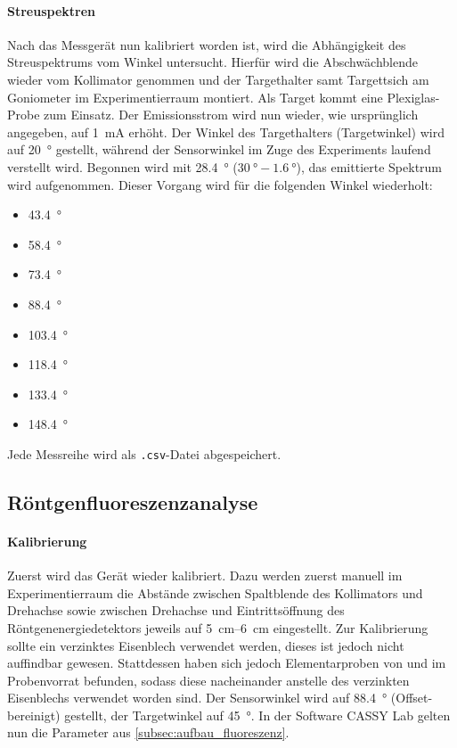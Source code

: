\documentclass[ngerman]{scrartcl}
\begin{document}
\paragraph{Streuspektren}
Nach das Messgerät nun kalibriert worden ist, wird die Abhängigkeit des Streuspektrums vom Winkel untersucht. Hierfür wird die Abschwächblende wieder vom Kollimator genommen und der Targethalter samt Targettsich am Goniometer im Experimentierraum montiert. Als Target kommt eine Plexiglas-Probe zum Einsatz. Der Emissionsstrom wird nun wieder, wie ursprünglich angegeben, auf \SI{1}{mA} erhöht. Der Winkel des Targethalters (Targetwinkel) wird auf \SI{20}{\degree} gestellt, während der Sensorwinkel im Zuge des Experiments laufend verstellt wird. Begonnen wird mit \SI{28.4}{\degree} ($\SI{30}{\degree} - \SI{1.6}{\degree}$), das emittierte Spektrum wird aufgenommen. Dieser Vorgang wird für die folgenden Winkel wiederholt:
\begin{itemize}
    \item \SI{43.4}{\degree}
    \item \SI{58.4}{\degree}
    \item \SI{73.4}{\degree}
    \item \SI{88.4}{\degree}
    \item \SI{103.4}{\degree}
    \item \SI{118.4}{\degree}
    \item \SI{133.4}{\degree}
    \item \SI{148.4}{\degree}
\end{itemize}
Jede Messreihe wird als \texttt{.csv}-Datei abgespeichert.


\subsection{Röntgenfluoreszenzanalyse}
\label{subsec:durchfuehrung_fluoreszenz}

\paragraph{Kalibrierung}
Zuerst wird das Gerät wieder kalibriert. Dazu werden zuerst manuell im Experimentierraum die Abstände zwischen Spaltblende des Kollimators und Drehachse sowie zwischen Drehachse und Eintrittsöffnung des Röntgenenergiedetektors jeweils auf \SIrange{5}{6}{cm} eingestellt. Zur Kalibrierung sollte ein verzinktes Eisenblech verwendet werden, dieses ist jedoch nicht auffindbar gewesen. Stattdessen haben sich jedoch Elementarproben von  und  im Probenvorrat befunden, sodass diese nacheinander anstelle des verzinkten Eisenblechs verwendet worden sind. Der Sensorwinkel wird auf \SI{88.4}{\degree} (Offset-bereinigt) gestellt, der Targetwinkel auf \SI{45}{\degree}. In der Software CASSY Lab gelten nun die Parameter aus \autoref{subsec:aufbau_fluoreszenz}.
\end{document}
